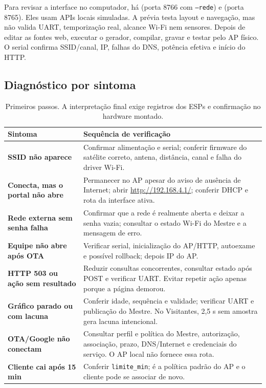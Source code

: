 Para revisar a interface no computador, há  (porta 8766 com \texttt{--rede}) e  (porta 8765). Eles usam APIs locais simuladas. A prévia testa layout e navegação, mas não valida UART, temporização real, alcance Wi-Fi nem sensores. Depois de editar as fontes web, executar o gerador, compilar, gravar e testar pelo AP físico. O serial confirma SSID/canal, IP, falhas do DNS, potência efetiva e início do HTTP.

\subsection{Diagnóstico por sintoma}\label{sec:diagnostico-wifi}
\begin{table}[htbp]\centering\small
\begin{tabularx}{\textwidth}{>{\bfseries}p{4.4cm}X}
\toprule
Sintoma & Sequência de verificação\\
\midrule
SSID não aparece & Confirmar alimentação e serial; conferir firmware do satélite correto, antena, distância, canal e falha do driver Wi-Fi.\\
Conecta, mas o portal não abre & Permanecer no AP apesar do aviso de ausência de Internet; abrir \url{http://192.168.4.1/}; conferir DHCP e rota da interface ativa.\\
Rede externa sem senha falha & Confirmar que a rede é realmente aberta e deixar a senha vazia; consultar o estado Wi-Fi do Mestre e a mensagem de erro.\\
Equipe não abre após OTA & Verificar serial, inicialização do AP/HTTP, autoexame e possível rollback; depois IP do AP.\\
HTTP 503 ou ação sem resultado & Reduzir consultas concorrentes, consultar estado após POST e verificar UART. Evitar repetir ação apenas porque a página demorou.\\
Gráfico parado ou com lacuna & Conferir idade, sequência e validade; verificar UART e publicação do Mestre. No Visitantes, 2,5 s sem amostra gera lacuna intencional.\\
OTA/Google não conectam & Consultar perfil e política do Mestre, autorização, associação, prazo, DNS/Internet e credenciais do serviço. O AP local não fornece essa rota.\\
Cliente cai após 15 min & Conferir \texttt{limite\_min}; é a política padrão do AP e o cliente pode se associar de novo.\\
\bottomrule
\end{tabularx}
\caption{Primeiros passos. A interpretação final exige registros dos ESPs e confirmação no hardware montado.}\label{tab:diagnostico-wifi}
\end{table}

